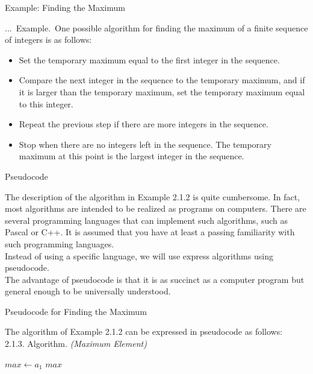 \documentclass[smaller,hyperref={CJKbookmarks=true}]{beamer}
\newcounter{zhuo}[subsection]
\renewcommand{\thezhuo}{\thesection.\thesubsection.\arabic{zhuo}}
\newenvironment{EXAMPLE}{\stepcounter{zhuo}\alert{\!\thezhuo.~Example.\,}}{}
\begin{document}
\begin{frame}[c]{Example: Finding the Maximum}
\begin{spacing}{1.1}
\begin{EXAMPLE}
One possible algorithm for finding the maximum of a
finite sequence of integers is as follows:
\begin{itemize}
  \item[1.] Set the temporary maximum equal to the first integer in the sequence.
  \item[2.] Compare the next integer in the sequence to the temporary
      maximum, and if it is larger than the temporary maximum, set the temporary maximum equal to this integer.
  \item[3.] Repeat the previous step if there are more integers in the sequence.
  \item[4.] Stop when there are no integers left in the sequence. The temporary maximum at this point is the largest integer in the sequence.
\end{itemize}
\end{EXAMPLE}
\end{spacing}
\end{frame}
\begin{frame}[c]{Pseudocode}
\begin{spacing}{1.1}
The description of the algorithm in Example 2.1.2 is quite cumbersome. In
fact, most algorithms are intended to be realized as programs on
computers. There are several programming languages that can implement
such algorithms, such as Pascal or C++. It is assumed that you have at
least a passing familiarity with such programming languages.\\[5pt]
Instead of using a specific language, we will use express algorithms using
pseudocode.\\[5pt]
The advantage of pseudocode is that it is as succinct as a computer
program but general enough to be universally understood.
\end{spacing}
\end{frame}
\begin{frame}[c]{Pseudocode for Finding the Maximum}
\begin{spacing}{1.1}
The algorithm of Example 2.1.2 can be expressed in pseudocode as follows:\\[5pt]
\alert{2.1.3. Algorithm.} \emph{(Maximum Element)}\\[4pt]
\IncMargin{1em}
\begin{algorithm}[H]
$max\leftarrow a_1$\;
\Return $max$
\end{algorithm}\DecMargin{1em}
\end{spacing}
\end{frame}
\end{document}
